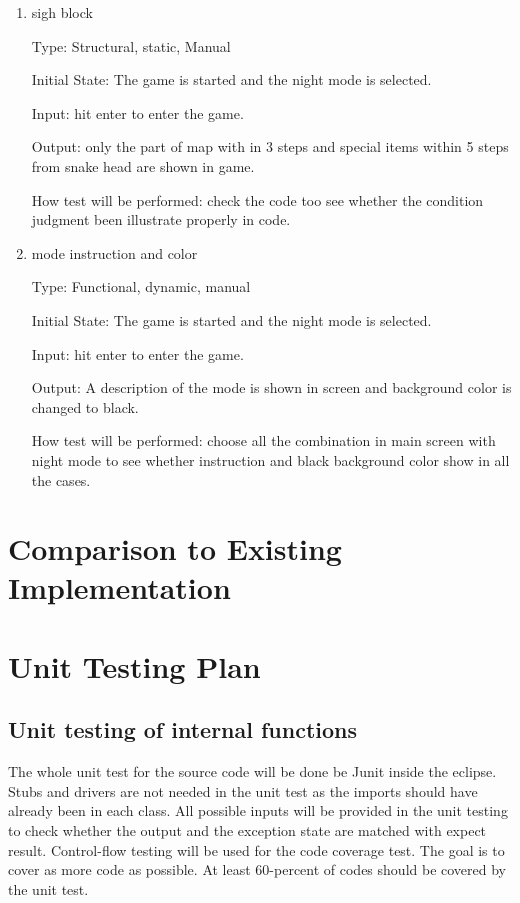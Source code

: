 \documentclass[12pt, titlepage]{article}
\begin{document}
\begin{enumerate}

\item{sigh block\\}

Type: Structural, static, Manual
					
Initial State: The game is started and the night mode is selected.

Input: hit enter to enter the game.
					
Output: only the part of map with in 3 steps and special items within 5 steps from snake head are shown in game.
					
How test will be performed: check the code too see whether the condition judgment been illustrate properly in code. 

\item{mode instruction and color\\}

Type: Functional, dynamic, manual
					
Initial State: The game is started and the night mode is selected.

Input: hit enter to enter the game.
					
Output: A description of the mode is shown in screen and background color is changed to black.
					
How test will be performed: choose all the combination in main screen with night mode to see whether instruction and black background color show in all the cases.


\end{enumerate}


	
\section{Comparison to Existing Implementation}	
				
\section{Unit Testing Plan}

\subsection{Unit testing of internal functions}
The whole unit test for the source code will be done be Junit inside the eclipse. Stubs and drivers are not needed in the unit test as the imports should have already been in each class. All possible inputs will be provided in the unit testing to check whether the output and the exception state are matched with expect result. Control-flow testing will be used for the code coverage test. The goal is to cover as more code as possible. At least 60-percent of codes should be covered by the unit test.
\end{document}
